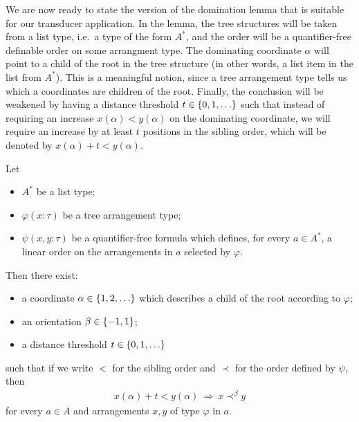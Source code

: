 We are now ready to state the version of the domination lemma that is suitable for our transducer application. In the lemma, the tree structures will be taken from a list type,  i.e.~a type of the form $A^*$, and the order will be a quantifier-free definable order on some arrangment type. The dominating coordinate $\alpha$ will point to a child of the root in the tree structure (in other words, a list item in the list from $A^*$). This is a meaningful notion, since a tree arrangement type tells us which a coordinates are children of the root.  Finally, the conclusion will be weakened by having  a distance threshold $t \in \{0,1,\ldots\}$ such that instead of requiring  an increase $x(\alpha) < y(\alpha)$ on the dominating coordinate, we will require an increase by at least $t$ positions in the sibling order, which will be denoted by $x(\alpha) + t < y(\alpha)$.

\begin{lemma}\label{lem:domination}
    Let 
\begin{itemize}
    \item $A^*$ be a list type;
    \item $\varphi(x : \tau)$  be a tree arrangement type;
    \item $\psi(x, y : \tau)$ be a quantifier-free formula which defines, for every $a \in A^*$,  a  linear order on the arrangements in $a$ selected by  $\varphi$.
\end{itemize}
Then there exist: 
\begin{itemize}
    \item a coordinate $\alpha \in \{1,2,\ldots\}$ which describes a child of the root according to $\varphi$;
    \item an orientation $\beta \in \{-1,1\}$; 
    \item a distance threshold $t \in \{0,1,\ldots\}$
\end{itemize}
such that if we write $<$ for the sibling order and $\prec$ for the order defined by $\psi$, then
\begin{align*}
x(\alpha) + t < y(\alpha) \ \Rightarrow \ x \prec^\beta y
\end{align*}
for every $a \in A$ and arrangements $x,y$ of type $\varphi$ in $a$.
\end{lemma}



